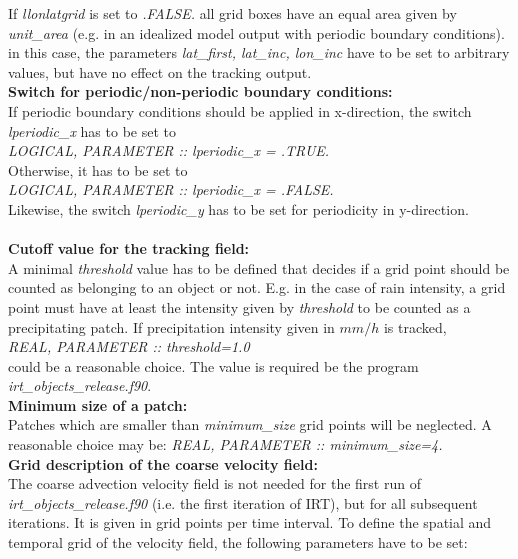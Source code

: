 \documentclass[11pt]{article}
\begin{document}
If {\it llonlatgrid} is set to {\it .FALSE.} all grid boxes have an equal area given by {\it unit\_area} (e.g. in an idealized model output with periodic boundary conditions). in this case, the parameters {\it lat\_first, lat\_inc, lon\_inc} have to be set to arbitrary values, but have no effect on the tracking output.
\vspace{0.5cm} \\
{\bf Switch for periodic/non-periodic boundary conditions:}\\
If periodic boundary conditions should be applied in x-direction, the switch {\it lperiodic\_x} has to be set to\\
{\it LOGICAL, PARAMETER    :: lperiodic\_x = .TRUE.}\\
Otherwise, it has to be set to\\
{\it LOGICAL, PARAMETER    :: lperiodic\_x = .FALSE.}\\
Likewise, the switch {\it lperiodic\_y} has to be set for periodicity in y-direction.\\
\vspace{0.5cm} \\
{\bf Cutoff value for the tracking field:}\\
A minimal {\it threshold} value has to be defined that decides if a grid point should be counted as belonging to an object or not. E.g. in the case of rain intensity, a grid point must have at least the intensity given by {\it threshold} to be counted as a precipitating patch. If precipitation intensity given in $mm/h$ is tracked,\\
{\it REAL, PARAMETER       :: threshold=1.0}\\
could be a reasonable choice. The value is required be the program {\it irt\_objects\_release.f90}.\vspace{0.5cm} \\
{\bf Minimum size of a patch:}\\
Patches which are smaller than {\it minimum\_size} grid points will be neglected. A reasonable choice may be:
{\it REAL, PARAMETER       :: minimum\_size=4.}\vspace{0.5cm} \\
{\bf Grid description of the coarse velocity field:}\\
The coarse advection velocity field is not needed for the first run of {\it irt\_objects\_release.f90} (i.e. the first iteration of IRT), but for all subsequent iterations. It is given in grid points per time interval. To define the spatial and temporal grid of the velocity field, the following parameters have to be set:
\end{document}
